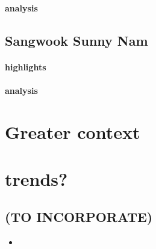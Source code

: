 \paragraph{analysis}

\subsection{Sangwook Sunny Nam}

\paragraph{highlights}
\paragraph{analysis}

\section{Greater context}

\section{trends?}

\begin{unsortedStuff}	
\section*{(TO INCORPORATE)}
	\begin{itemize}
		\item 
	\end{itemize}
\end{unsortedStuff}
		
\begin{optBlankSpace}
	\newpage
	\mbox{}
\end{optBlankSpace}

